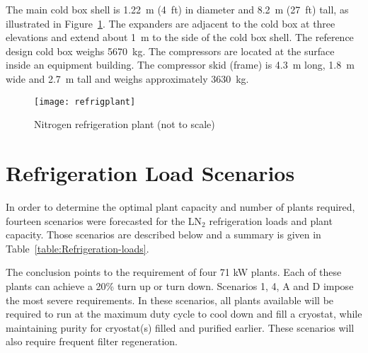 The main cold box shell is 1.22~m (4~ft) in diameter and 8.2~m (27~ft) tall, 
as illustrated in Figure~\ref{fig:nitrogren-refrigerator}. The expanders 
are adjacent to the cold box at three elevations and extend about 1~m to
the side of the cold box shell. The reference design cold box weighs 5670~kg. The 
compressors are located at the surface inside an equipment building. 
The compressor skid (frame) is 4.3~m long, 1.8~m wide and 2.7~m tall 
and weighs approximately 3630~kg.  

\begin{figure}[htbp]
\centering
\texttt{[image: refrigplant]}
\caption{Nitrogen refrigeration plant (not to scale)}
\label{fig:nitrogren-refrigerator}
\end{figure}

\section{Refrigeration Load Scenarios}
\label{sec:refrigeration-load-scenarios}


In order to determine the optimal plant capacity and number of plants 
required, fourteen scenarios were forecasted for the LN$_2$ refrigeration
loads and plant capacity.  Those scenarios are described below and 
a summary is given in Table~\ref{table:Refrigeration-loads}. 
                          
The conclusion points to the requirement of four 71 kW plants. Each of 
these plants can achieve a 20\% turn up or turn down. Scenarios 1, 4, 
A and D impose the most severe requirements. In these scenarios, all 
plants available will be required to run at the maximum duty cycle 
to cool down and fill a cryostat, while maintaining purity for
cryostat(s) filled and purified earlier. These scenarios will
also require frequent filter regeneration.

